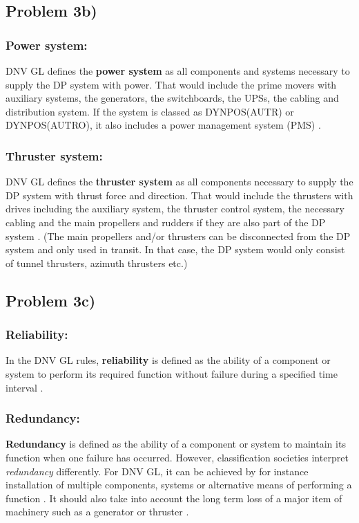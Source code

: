 \subsection{Problem 3b)} \label{sec:3b}
\subsubsection{Power system:}
DNV GL defines the \textbf{power system} as all components and systems necessary to supply the DP system with power. That would include the prime movers with auxiliary systems, the generators, the switchboards, the UPSs, the cabling and distribution system. If the system is classed as DYNPOS(AUTR) or DYNPOS(AUTRO), it also includes a power management system (PMS) \cite{RulesShipsDNVGLPart6Chap3}.  


\subsubsection{Thruster system:}
DNV GL defines the \textbf{thruster system} as all components necessary to supply the DP system with thrust force and direction. That would include the thrusters with drives including the auxiliary system, the thruster control system, the necessary cabling and the main propellers and rudders if they are also part of the DP system \cite{RulesShipsDNVGLPart6Chap3}. (The main propellers and/or thrusters can be disconnected from the DP system and only used in transit. In that case, the DP system would only consist of tunnel thrusters, azimuth thrusters etc.)




\subsection{Problem 3c)}

\subsubsection{Reliability:} 
In the DNV GL rules, \textbf{reliability} is defined as the ability of a component or system to perform its required function without failure during a specified time interval \cite{RulesShipsDNVGLPart6Chap3}.

\subsubsection{Redundancy:} 
\textbf{Redundancy} is defined as the ability of a component or system to maintain its function when one failure has occurred.
However, classification societies interpret \textit{redundancy} differently. For DNV GL, it can be achieved by for instance installation of multiple components, systems or alternative means of performing a function \cite{RulesShipsDNVGLPart6Chap3}. It should also take into account the long term loss  of a major item of machinery such as a generator or thruster \cite{RecommendedPractices_DP_DNVGL}.  %


